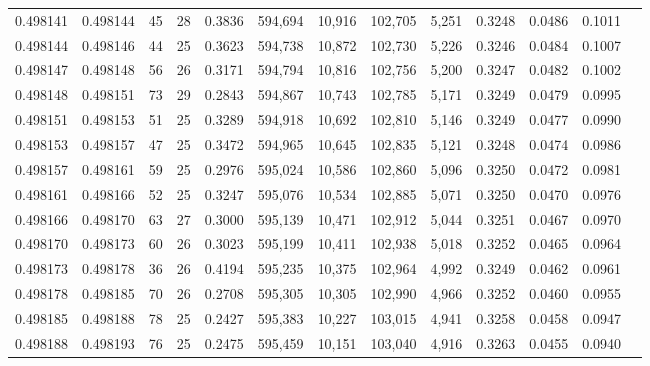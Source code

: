 \begin{tabular}{rrrrrrrrrrrrr}
0.498141 & 0.498144 &  45 &  28 &                                     0.3836 & 594,694 &  10,916 & 102,705 &   5,251 & 0.3248 & 0.0486 & 0.1011 \\
0.498144 & 0.498146 &  44 &  25 &                                     0.3623 & 594,738 &  10,872 & 102,730 &   5,226 & 0.3246 & 0.0484 & 0.1007 \\
0.498147 & 0.498148 &  56 &  26 &                                     0.3171 & 594,794 &  10,816 & 102,756 &   5,200 & 0.3247 & 0.0482 & 0.1002 \\
0.498148 & 0.498151 &  73 &  29 &                                     0.2843 & 594,867 &  10,743 & 102,785 &   5,171 & 0.3249 & 0.0479 & 0.0995 \\
0.498151 & 0.498153 &  51 &  25 &                                     0.3289 & 594,918 &  10,692 & 102,810 &   5,146 & 0.3249 & 0.0477 & 0.0990 \\
0.498153 & 0.498157 &  47 &  25 &                                     0.3472 & 594,965 &  10,645 & 102,835 &   5,121 & 0.3248 & 0.0474 & 0.0986 \\
0.498157 & 0.498161 &  59 &  25 &                                     0.2976 & 595,024 &  10,586 & 102,860 &   5,096 & 0.3250 & 0.0472 & 0.0981 \\
0.498161 & 0.498166 &  52 &  25 &                                     0.3247 & 595,076 &  10,534 & 102,885 &   5,071 & 0.3250 & 0.0470 & 0.0976 \\
0.498166 & 0.498170 &  63 &  27 &                                     0.3000 & 595,139 &  10,471 & 102,912 &   5,044 & 0.3251 & 0.0467 & 0.0970 \\
0.498170 & 0.498173 &  60 &  26 &                                     0.3023 & 595,199 &  10,411 & 102,938 &   5,018 & 0.3252 & 0.0465 & 0.0964 \\
0.498173 & 0.498178 &  36 &  26 &                                     0.4194 & 595,235 &  10,375 & 102,964 &   4,992 & 0.3249 & 0.0462 & 0.0961 \\
0.498178 & 0.498185 &  70 &  26 &                                     0.2708 & 595,305 &  10,305 & 102,990 &   4,966 & 0.3252 & 0.0460 & 0.0955 \\
0.498185 & 0.498188 &  78 &  25 &                                     0.2427 & 595,383 &  10,227 & 103,015 &   4,941 & 0.3258 & 0.0458 & 0.0947 \\
0.498188 & 0.498193 &  76 &  25 &                                     0.2475 & 595,459 &  10,151 & 103,040 &   4,916 & 0.3263 & 0.0455 & 0.0940 \\

\end{tabular}

